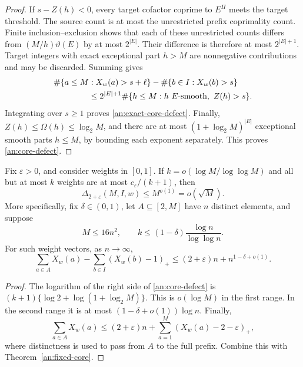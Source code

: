 \begin{proof}
If \(s-Z(h)<0\), every target cofactor coprime to \(E^{\Pi}\) meets
the target threshold. The source count is at most the unrestricted
prefix coprimality count. Finite inclusion--exclusion shows that each
of these unrestricted counts differs from
\((M/h)\vartheta(E)\) by at most \(2^{|E|}\). Their difference is
therefore at most \(2^{|E|+1}\). Target integers with exact
exceptional part \(h>M\) are nonnegative contributions and may be
discarded. Summing gives
\begin{align}
 &\#\{a\le M:X_w(a)>s+\ell\}
   -\#\{b\in I:X_w(b)>s\} \notag\\
 &\hspace{15mm}\le
 2^{|E|+1}\#\{h\le M:h\ E\text{-smooth},\ Z(h)>s\}.
 \label{an:core-level-defect}
\end{align}
Integrating over \(s\ge1\) proves \eqref{an:exact-core-defect}.
Finally, \(Z(h)\le\Omega(h)\le\log_2M\), and there are at most
\((1+\log_2M)^{|E|}\) exceptional smooth parts \(h\le M\), by
bounding each exponent separately. This proves \eqref{an:core-defect}.
\end{proof}

\begin{corollary}
\label{an:growing-core}
Fix \(\varepsilon>0\), and consider weights in \([0,1]\). If
\(k=o(\log M/\log\log M)\) and all but
at most \(k\) weights are at most \(c_\varepsilon/(k+1)\), then
\[
 \Delta_{2+\varepsilon}(M,I,w)\le M^{o(1)}=o(\sqrt M).
\]
More specifically, fix \(\delta\in(0,1)\), let \(A\subseteq[2,M]\)
have \(n\) distinct elements, and suppose
\[
 M\le16n^2,
 \qquad k\le(1-\delta)\frac{\log n}{\log\log n}.
\]
For such weight vectors, as \(n\to\infty\),
\begin{equation}
 \sum_{a\in A}X_w(a)-\sum_{b\in I}(X_w(b)-1)_+
 \le(2+\varepsilon)n+n^{1-\delta+o(1)}.
 \label{an:dual-exclusion}
\end{equation}
\end{corollary}

\begin{proof}
The logarithm of the right side of \eqref{an:core-defect} is
\((k+1)\{\log2+\log(1+\log_2M)\}\). This is \(o(\log M)\) in
the first range. In the second range it is at most
\((1-\delta+o(1))\log n\). Finally,
\[
 \sum_{a\in A}X_w(a)
 \le(2+\varepsilon)n+
      \sum_{a=1}^{M}(X_w(a)-2-\varepsilon)_+,
\]
where distinctness is used to pass from \(A\) to the full prefix.
Combine this with Theorem~\ref{an:fixed-core}.
\end{proof}

